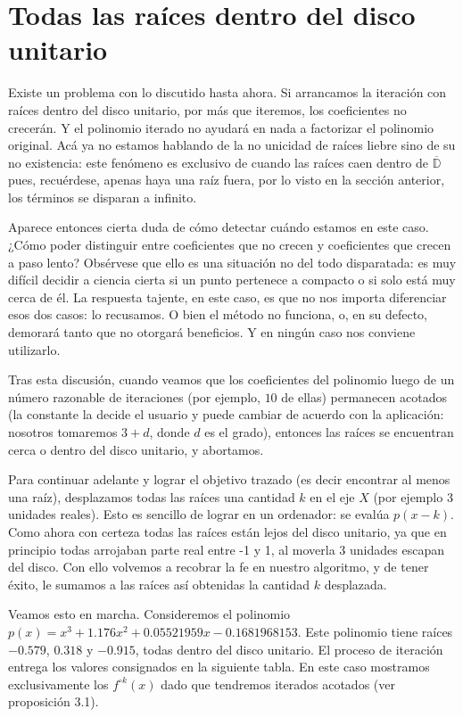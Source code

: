 \documentclass[oneside,11pt]{book}
\theoremstyle{definition}
\theoremstyle{plain}
\theoremstyle{remark}
\begin{document}
\section{Todas las ra\'ices dentro del disco unitario}

Existe un problema con lo discutido hasta ahora.  
Si arrancamos la iteraci\'on con ra\'ices dentro del disco unitario, 
por m\'as que iteremos, los coeficientes no crecer\'an. 
Y el polinomio iterado no ayudar\'a en nada a factorizar el polinomio original. 
Ac\'a ya no estamos hablando de la no unicidad de ra\'ices liebre sino de su no existencia:  
este fen\'omeno es exclusivo de cuando las ra\'ices caen dentro de $\overline{\mathbb{D}}$ 
pues, recu\'erdese, apenas haya una ra\'iz fuera, por lo visto en la secci\'on anterior,
los t\'erminos se disparan a infinito.

Aparece entonces cierta duda de c\'omo detectar cu\'ando estamos en este caso. 
¿C\'omo poder distinguir entre coeficientes que no crecen y coeficientes que crecen a paso lento? 
Obs\'ervese que ello es una situaci\'on no del todo disparatada: 
es muy dif\'icil decidir a ciencia cierta si un punto pertenece a compacto o si solo est\'a muy cerca de \'el. 
La respuesta tajente, en este caso, es que no nos importa diferenciar esos dos casos: lo recusamos. 
O bien el m\'etodo no funciona, o, en su defecto, demorar\'a tanto que no otorgar\'a beneficios. 
Y en ning\'un caso nos conviene utilizarlo. 

Tras esta discusi\'on, 
cuando veamos que los coeficientes del polinomio luego de un n\'umero razonable de iteraciones 
(por ejemplo, $10$ de ellas) 
permanecen acotados 
(la constante la decide el usuario y puede cambiar de acuerdo con la aplicaci\'on: 
nosotros tomaremos $3+d$, donde $d$ es el grado),  
entonces las ra\'ices se encuentran  cerca o dentro del disco unitario, y abortamos.

Para continuar adelante y lograr el objetivo trazado (es decir encontrar al menos una ra\'iz), 
desplazamos todas las ra\'ices una cantidad $k$ en el eje $X$ (por ejemplo $3$ unidades reales).
Esto es sencillo de lograr en un ordenador: se eval\'ua $p(x-k)$. 
Como ahora con certeza todas las ra\'ices est\'an lejos del disco unitario, 
ya que en principio todas arrojaban parte real entre -1 y 1, al moverla 3 unidades escapan del disco.
Con ello volvemos a recobrar la fe en nuestro algoritmo, y de tener \'exito, 
le sumamos a las ra\'ices as\'i obtenidas la cantidad $k$ desplazada. 

Veamos esto en marcha. 
Consideremos el polinomio  $p(x)=x^3+1.176x^2+0.05521959x-0.1681968153$. 
Este polinomio tiene ra\'ices $-0.579$, $0.318$ y $-0.915$, 
todas dentro del disco unitario. 
El proceso de iteraci\'on entrega los valores consignados en la siguiente tabla. 
En este caso mostramos exclusivamente los $f^{\circ k}(x)$ 
dado que tendremos iterados acotados (ver proposici\'on 3.1).
\end{document}
